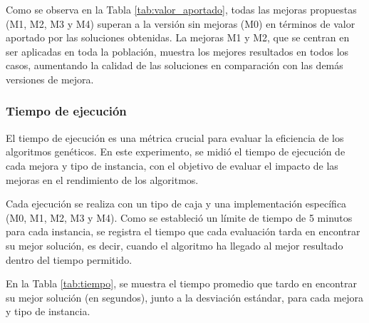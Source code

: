 Como se observa en la Tabla \ref{tab:valor_aportado}, todas las mejoras propuestas (M1, M2, M3 y M4) superan a la versión sin mejoras (M0) en términos de valor aportado por las soluciones obtenidas. La mejoras M1 y M2, que se centran en ser aplicadas en toda la población, muestra los mejores resultados en todos los casos, aumentando la calidad de las soluciones en comparación con las demás versiones de mejora.

\subsubsection{Tiempo de ejecución}

El tiempo de ejecución es una métrica crucial para evaluar la eficiencia de los algoritmos genéticos. En este experimento, se midió el tiempo de ejecución de cada mejora y tipo de instancia, con el objetivo de evaluar el impacto de las mejoras en el rendimiento de los algoritmos.

Cada ejecución se realiza con un tipo de caja y una implementación específica (M0, M1, M2, M3 y M4). Como se estableció un límite de tiempo de 5 minutos para cada instancia, se registra el tiempo que cada evaluación tarda en encontrar su mejor solución, es decir, cuando el algoritmo ha llegado al mejor resultado dentro del tiempo permitido.

En la Tabla \ref{tab:tiempo}, se muestra el tiempo promedio que tardo en encontrar su mejor solución (en segundos), junto a la desviación estándar, para cada mejora y tipo de instancia.

